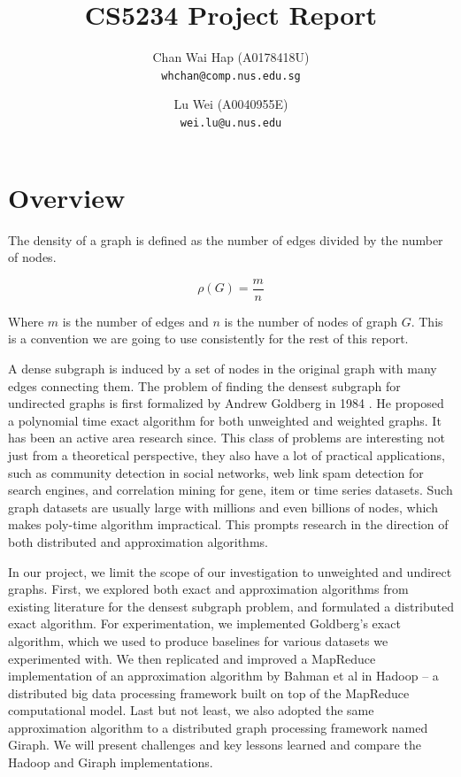 \documentclass{article}
\title{CS5234 Project Report}
\author{
  Chan Wai Hap (A0178418U) \\
  \texttt{whchan@comp.nus.edu.sg}
  \and
  Lu Wei (A0040955E) \\
  \texttt{wei.lu@u.nus.edu}
}
\begin{document}
\maketitle

\tableofcontents

\pagebreak

\section{Overview}
The density of a graph is defined as the number of edges divided by the number of nodes.

\begin{equation}
  \rho(G) = \frac{m}{n}
\end{equation}

Where $m$ is the number of edges and $n$ is the number of nodes of graph $G$. This is a convention we are going to use consistently for the rest of this report.

A dense subgraph is induced by a set of nodes in the original graph with many edges connecting them. The problem of finding the densest subgraph for undirected graphs is first formalized by Andrew Goldberg in 1984 \cite{Goldberg:CSD-84-171}. He proposed a polynomial time exact algorithm for both unweighted and weighted graphs. It has been an active area research since. This class of problems are interesting not just from a theoretical perspective, they also have a lot of practical applications, such as community detection in social networks, web link spam detection for search engines, and correlation mining for gene, item or time series datasets. Such graph datasets are usually large with millions and even billions of nodes, which makes poly-time algorithm impractical. This prompts research in the direction of both distributed and approximation algorithms.

In our project, we limit the scope of our investigation to unweighted and undirect graphs. First, we explored both exact and approximation algorithms from existing literature for the densest subgraph problem, and formulated a distributed exact algorithm. For experimentation, we implemented Goldberg's exact algorithm, which we used to produce baselines for various datasets we experimented with. We then replicated and improved a MapReduce implementation of an approximation algorithm by Bahman et al in Hadoop – a distributed big data processing framework built on top of the MapReduce computational model. Last but not least, we also adopted the same approximation algorithm to a distributed graph processing framework named Giraph. We will present challenges and key lessons learned and compare the Hadoop and Giraph implementations.
\end{document}
